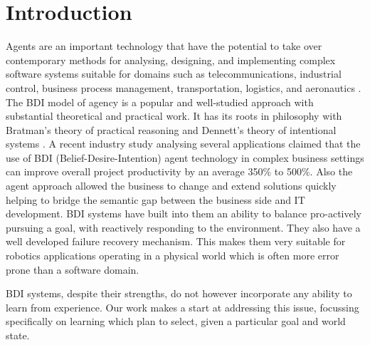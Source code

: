 \section{Introduction}\label{sec:intro}

Agents are an important technology that have the potential to take over
contemporary methods for analysing, designing, and implementing complex software
systems suitable for domains such as telecommunications, industrial control,
business process management, transportation, logistics, and aeronautics
\cite{Jennings:COMACM01,Belecheanu:AAMAS06,Ljungberg:PRICAI92-OASIS,Ziming:AAC07}.
The BDI model of agency \cite{Pollack:AIJ92-IRMA,Bratman88} is a popular and
well-studied approach with substantial theoretical and practical work. It has its
roots in philosophy with Bratman's \cite{Bratman87:Intentions} theory of practical
reasoning and Dennett's theory of intentional systems \cite{Dennet97:IntentionalStance}.
A recent industry study \cite{Benfield:AAMAS06} analysing several applications
claimed that the use of BDI (Belief-Desire-Intention) agent technology in complex
business settings can improve overall project productivity by an average 350\% to
500\%. Also the agent approach allowed the business to change and extend
solutions quickly helping to bridge the semantic gap between the business side
and IT development.
BDI systems have built into them an ability to balance pro-actively
pursuing a goal, with reactively responding to the environment. They
also have a well developed failure recovery mechanism. This makes them
very suitable for robotics applications operating in a physical world
which is often more error prone than a software domain.

BDI systems, despite their strengths, do not however incorporate any
ability to learn from experience. Our work makes a start at addressing
this issue, focussing specifically on learning which plan to select,
given a particular goal and world state.

